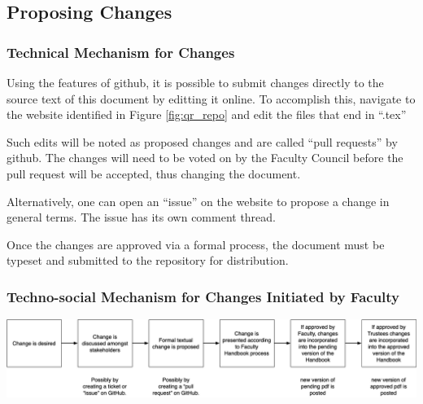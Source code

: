 	\subsection{Proposing Changes}
		\subsubsection{Technical Mechanism for Changes}
			Using the features of github, it is possible to submit changes
			directly to the source text of this document by editting
			it online. To accomplish this,
			navigate to the website identified in Figure \ref{fig:qr_repo} and
			edit the files that end in ``.tex''

			Such edits will be noted as proposed changes and are called ``pull requests'' by github.
			The changes will need to be voted on by the Faculty Council before the pull request will be accepted, thus changing the document.

			Alternatively, one can open an ``issue'' on the website to propose a change in general terms.  The issue has its own
			comment thread.

			Once the changes are approved via a formal process, the document must be typeset and submitted to the repository for distribution.
		\subsubsection{Techno-social Mechanism for Changes Initiated by Faculty}
			\begin{center}
				\includegraphics[width=\textwidth]{images/change_process.png}
			\end{center}





